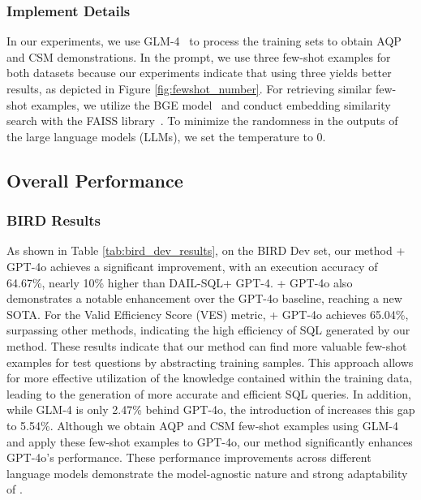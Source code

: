 \subsubsection{Implement Details}

In our experiments, we use GLM-4~\citep{glm2024chatglm} to process the training sets to obtain AQP and CSM demonstrations. 
In the prompt, we use three few-shot examples for both datasets because our experiments indicate that using three yields better results, as depicted in Figure \ref{fig:fewshot_number}.
For retrieving similar few-shot examples, we utilize the BGE model~\citep{zhang2023retrieve} and conduct embedding similarity search with the FAISS library~\citep{douze2024faiss}.
To minimize the randomness in the outputs of the large language models (LLMs), we set the temperature to 0. 



\subsection{Overall Performance}

\subsubsection{BIRD Results}

As shown in Table \ref{tab:bird_dev_results}, on the BIRD Dev set, our method \method+ GPT-4o achieves a significant improvement, with an execution accuracy of 64.67\%, nearly 10\% higher than DAIL-SQL+ GPT-4. 
\method+ GPT-4o also demonstrates a notable enhancement over the GPT-4o baseline, reaching a new SOTA. 
For the Valid Efficiency Score (VES) metric, \method+ GPT-4o achieves 65.04\%, surpassing other methods, indicating the high efficiency of SQL generated by our method.
These results indicate that our method can find more valuable few-shot examples for test questions by abstracting training samples. This approach allows for more effective utilization of the knowledge contained within the training data, leading to the generation of more accurate and efficient SQL queries.
In addition, while GLM-4 is only 2.47\% behind GPT-4o, the introduction of \method increases this gap to 5.54\%. 
Although we obtain AQP and CSM few-shot examples using GLM-4 and apply these few-shot examples to GPT-4o, our method significantly enhances GPT-4o's performance. 
These performance improvements across different language models demonstrate the model-agnostic nature and strong adaptability of \method.


